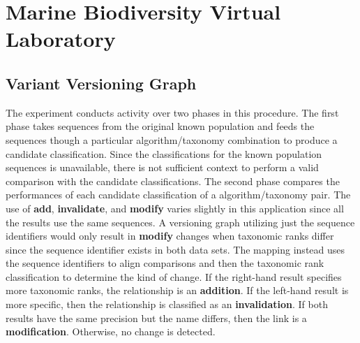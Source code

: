 \section{Marine Biodiversity Virtual Laboratory}

\subsection{Variant Versioning Graph}

The experiment conducts activity over two phases in this procedure.
The first phase takes sequences from the original known population and feeds the sequences though a particular algorithm/taxonomy combination to produce a candidate classification.
Since the classifications for the known population sequences is unavailable, there is not sufficient context to perform a valid comparison with the candidate classifications.
The second phase compares the performances of each candidate classification of a algorithm/taxonomy pair.
The use of \textbf{add}, \textbf{invalidate}, and \textbf{modify} varies slightly in this application since all the results use the same sequences.
A versioning graph utilizing just the sequence identifiers would only result in \textbf{modify} changes when taxonomic ranks differ since the sequence identifier exists in both data sets.
The mapping instead uses the sequence identifiers to align comparisons and then the taxonomic rank classification to determine the kind of change.
If the right-hand result specifies more taxonomic ranks, the relationship is an \textbf{addition}.
If the left-hand result is more specific, then the relationship is classified as an \textbf{invalidation}.
If both results have the same precision but the name differs, then the link is a \textbf{modification}.
Otherwise, no change is detected.


